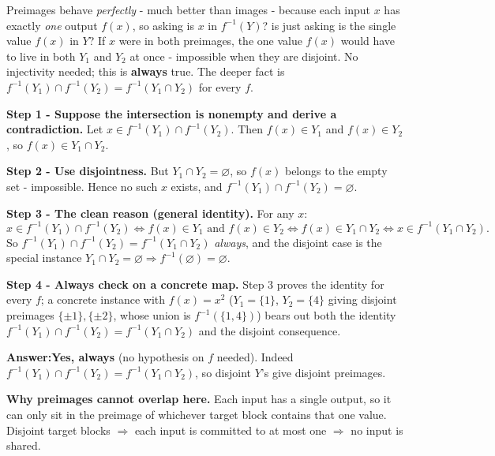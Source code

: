 \documentclass[11pt,a4paper]{article}
\newcommand{\answer}[1]{\begin{answerbox}\centering\textbf{Answer:}\quad #1\end{answerbox}}
\begin{document}
\begin{ideabox}
Preimages behave \emph{perfectly} - much better than images - because each input $x$ has exactly
\emph{one} output $f(x)$, so asking \textquotedbl{}is $x$ in $f^{-1}(Y)$?\textquotedbl{} is just
asking \textquotedbl{}is the single value $f(x)$ in $Y$?\textquotedbl{} If $x$ were in both
preimages, the one value $f(x)$ would have to live in both $Y_1$ and $Y_2$ at once - impossible
when they are disjoint. No injectivity needed; this is \textbf{always} true. The deeper fact is
$f^{-1}(Y_1)\cap f^{-1}(Y_2)=f^{-1}(Y_1\cap Y_2)$ for every $f$.
\end{ideabox}

\textbf{Step 1 - Suppose the intersection is nonempty and derive a contradiction.} Let
$x\in f^{-1}(Y_1)\cap f^{-1}(Y_2)$. Then $f(x)\in Y_1$ and $f(x)\in Y_2$, so
$f(x)\in Y_1\cap Y_2$.

\textbf{Step 2 - Use disjointness.} But $Y_1\cap Y_2=\varnothing$, so $f(x)$ belongs to the empty
set - impossible. Hence no such $x$ exists, and $f^{-1}(Y_1)\cap f^{-1}(Y_2)=\varnothing$.

\textbf{Step 3 - The clean reason (general identity).} For any $x$:
\[
x\in f^{-1}(Y_1)\cap f^{-1}(Y_2)
\iff f(x)\in Y_1 \text{ and } f(x)\in Y_2
\iff f(x)\in Y_1\cap Y_2
\iff x\in f^{-1}(Y_1\cap Y_2).
\]
So $f^{-1}(Y_1)\cap f^{-1}(Y_2)=f^{-1}(Y_1\cap Y_2)$ \emph{always}, and the disjoint case is the
special instance $Y_1\cap Y_2=\varnothing\Rightarrow f^{-1}(\varnothing)=\varnothing$.

\textbf{Step 4 - Always check on a concrete map.} Step 3 proves the identity for every $f$; a
concrete instance with $f(x)=x^2$ ($Y_1=\{1\}$, $Y_2=\{4\}$ giving disjoint preimages
$\{\pm1\},\{\pm2\}$, whose union is $f^{-1}(\{1,4\})$) bears out both the identity
$f^{-1}(Y_1)\cap f^{-1}(Y_2)=f^{-1}(Y_1\cap Y_2)$ and the disjoint consequence.

\answer{\textbf{Yes, always} (no hypothesis on $f$ needed). Indeed
$f^{-1}(Y_1)\cap f^{-1}(Y_2)=f^{-1}(Y_1\cap Y_2)$, so disjoint $Y$'s give disjoint preimages.}

\medskip
\textbf{Why preimages cannot overlap here.} Each input has a single output, so it can only sit in
the preimage of whichever target block contains that one value. Disjoint target blocks $\Rightarrow$
each input is committed to at most one $\Rightarrow$ no input is shared.
\end{document}
